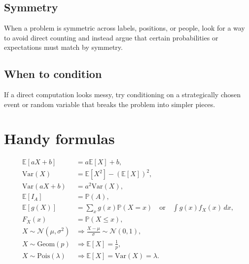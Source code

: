 \documentclass[11pt]{article}
\newcommand{\E}{\mathbb{E}}
\newcommand{\Var}{\mathrm{Var}}
\newcommand{\Prob}{\mathbb{P}}
\newcommand{\1}{\mathbf{1}}
\newcommand{\Geom}{\mathrm{Geom}}
\newcommand{\Pois}{\mathrm{Pois}}
\newcommand{\Normal}{\mathcal{N}}
\begin{document}
\subsection{Symmetry}
When a problem is symmetric across labels, positions, or people, look for a way to avoid direct counting and instead argue that certain probabilities or expectations must match by symmetry.

\subsection{When to condition}
If a direct computation looks messy, try conditioning on a strategically chosen event or random variable that breaks the problem into simpler pieces.

\section{Handy formulas}
\begin{align*}
\E[aX+b] &= a\E[X]+b,\\
\Var(X) &= \E[X^2]-(\E[X])^2,\\
\Var(aX+b) &= a^2\Var(X),\\
\E[I_A] &= \Prob(A),\\
\E[g(X)] &= \sum_x g(x)\Prob(X=x) \quad \text{or} \quad \int g(x)f_X(x)\,dx,\\
F_X(x) &= \Prob(X\le x),\\
X\sim \Normal(\mu,\sigma^2) &\Rightarrow \frac{X-\mu}{\sigma}\sim \Normal(0,1),\\
X\sim \Geom(p) &\Rightarrow \E[X]=\frac{1}{p},\\
X\sim \Pois(\lambda) &\Rightarrow \E[X]=\Var(X)=\lambda.
\end{align*}
\end{document}
